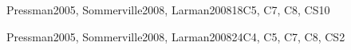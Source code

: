 \begin{syllabus}
\begin{unit}{\SESoftwareDesign}{}{Pressman2005, Sommerville2008, Larman2008}{18}{C5, C7, C8, CS10}
\begin{learningoutcomes}
    \item \SESoftwareDesignLOSelectSuitable [\Usage] %
    \item \SESoftwareDesignLOExplainHowMight [\Familiarity] %
    \item \SESoftwareDesignLODesignAA [\Usage] %
    \item \SESoftwareDesignLODiscussAnd [\Usage] %
    \item \SESoftwareDesignLOApplyModels [\Usage] %
    \item \SESoftwareDesignLOAnalyzeAFrom [\Assessment] %
    \item \SESoftwareDesignLOAnalyzeAFromOf [\Assessment] %
    \item \SESoftwareDesignLOExplainTheObjects [\Familiarity] %
    \item \SESoftwareDesignLOApplyComponent [\Usage] %
    \item \SESoftwareDesignLORefactorAn [\Usage] %
    \item \SESoftwareDesignLOStateAnd [\Familiarity] %
\end{learningoutcomes}
\end{unit}

\begin{unit}{\SESoftwareConstruction}{}{Pressman2005, Sommerville2008, Larman2008}{24}{C4, C5, C7, C8, CS2}
\begin{topics}
    \item \SESoftwareConstructionTopicCoding
    \item \SESoftwareConstructionTopicCodingStandards
    \item \SESoftwareConstructionTopicIntegration
    \item \SESoftwareConstructionTopicDevelopment
    \item \SESoftwareConstructionTopicPotential
\end{topics}
\begin{learningoutcomes}%
    \item \SESoftwareConstructionLODescribeTechniques [\Assessment]
    \item \SESoftwareConstructionLOBuild [\Assessment]
    \item \SESoftwareConstructionLODescribeSecure [\Assessment]
    \item \SESoftwareConstructionLOSelectAndDefined [\Assessment]
    \item \SESoftwareConstructionLOCompareAndStrategies [\Assessment]
    \item \SESoftwareConstructionLODescribeTheAnalyzing [\Assessment]
    \item \SESoftwareConstructionLODescribeTheAnalyzingChanges [\Assessment]
    \item \SESoftwareConstructionLORewrite [\Assessment]
    \item \SESoftwareConstructionLOWriteAThatNon [\Assessment]
\end{learningoutcomes}
\end{unit}


\end{syllabus}
